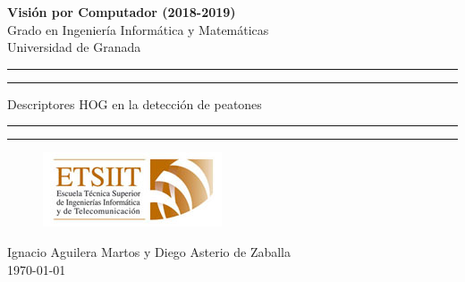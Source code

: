 \documentclass[a4paper,12pt]{article}
\begin{document}
	\begin{center}
		\LARGE{\textbf{Visión por Computador (2018-2019)} \\ Grado en Ingeniería Informática y Matemáticas \\ Universidad de Granada }
		\vspace*{2.5cm}

		\rule{\textwidth}{1.6pt}\vspace*{-\baselineskip}\vspace*{4pt}
		\rule{\textwidth}{1.6pt}\vspace*{-\baselineskip}\vspace*{2pt}
		\vspace{0.5cm}

		\Huge{Descriptores HOG en la detección de peatones}

		\vspace{0.5cm}
		\rule{\textwidth}{1.6pt}\vspace*{-\baselineskip}\vspace*{2pt}
		\rule{\textwidth}{1.6pt}\vspace*{-\baselineskip}\vspace*{4pt}

		\vspace{4cm}

\begin{figure}[h!]
	\centering
	\includegraphics[scale=0.75]{./Imagenes/etsiit.jpeg}
	\label{fig:logoETSIIT}
\end{figure}

		\vspace{4cm}
		\large{Ignacio Aguilera Martos y Diego Asterio de Zaballa \\ \today }

	\end{center}




\newpage

\tableofcontents

\newpage

\end{document}
